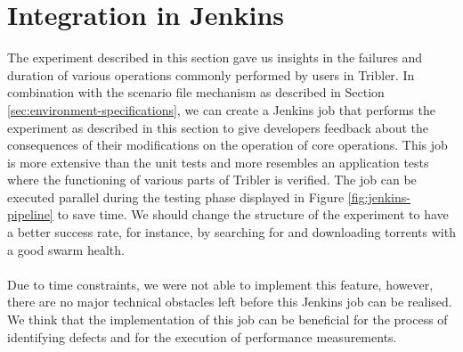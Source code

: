 \section{Integration in Jenkins}
The experiment described in this section gave us insights in the failures and duration of various operations commonly performed by users in Tribler. In combination with the scenario file mechanism as described in Section \ref{sec:environment-specifications}, we can create a Jenkins job that performs the experiment as described in this section to give developers feedback about the consequences of their modifications on the operation of core operations. This job is more extensive than the unit tests and more resembles an application tests where the functioning of various parts of Tribler is verified. The job can be executed parallel during the testing phase displayed in Figure \ref{fig:jenkins-pipeline} to save time. We should change the structure of the experiment to have a better success rate, for instance, by searching for and downloading torrents with a good swarm health.\\\\
Due to time constraints, we were not able to implement this feature, however, there are no major technical obstacles left before this Jenkins job can be realised. We think that the implementation of this job can be beneficial for the process of identifying defects and for the execution of performance measurements.
